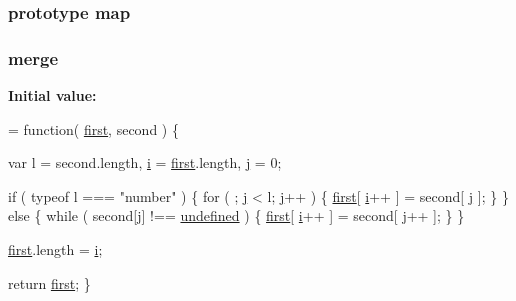 \subsubsection[{map}]{ {\bf prototype} map}\label{jquery-1_810_82-vsdoc_8js_a20838f8c4bedc779e51bf830f5a4d471}
\hypertarget{jquery-1_810_82-vsdoc_8js_a32b25eeaa50c1bd6453e8956949b36e3}{}
\subsubsection[{merge}]{ merge}\label{jquery-1_810_82-vsdoc_8js_a32b25eeaa50c1bd6453e8956949b36e3}
{\bfseries Initial value\+:}
\begin{DoxyCode}
= \textcolor{keyword}{function}( \hyperlink{jquery-1_810_82-vsdoc_8js_a436adcac6bdff190fbce85670078e885}{first}, second ) \{


        var l = second.length,
            \hyperlink{_bibabook_2_scripts_2respond_8min_8js_a5e25b1d1bed9ab5f3174b76d6a722180}{i} = \hyperlink{jquery-1_810_82-vsdoc_8js_a436adcac6bdff190fbce85670078e885}{first}.length,
            \hyperlink{_bibabook_2_scripts_2jquery_8validate_8unobtrusive_8min_8js_a5f7d9fc7ba35dc513eb3080d74d27476}{j} = 0;

        \textcolor{keywordflow}{if} ( typeof l === \textcolor{stringliteral}{"number"} ) \{
            \textcolor{keywordflow}{for} ( ; \hyperlink{_bibabook_2_scripts_2jquery_8validate_8unobtrusive_8min_8js_a5f7d9fc7ba35dc513eb3080d74d27476}{j} < l; \hyperlink{_bibabook_2_scripts_2jquery_8validate_8unobtrusive_8min_8js_a5f7d9fc7ba35dc513eb3080d74d27476}{j}++ ) \{
                \hyperlink{jquery-1_810_82-vsdoc_8js_a436adcac6bdff190fbce85670078e885}{first}[ \hyperlink{_bibabook_2_scripts_2respond_8min_8js_a5e25b1d1bed9ab5f3174b76d6a722180}{i}++ ] = second[ \hyperlink{_bibabook_2_scripts_2jquery_8validate_8unobtrusive_8min_8js_a5f7d9fc7ba35dc513eb3080d74d27476}{j} ];
            \}
        \} \textcolor{keywordflow}{else} \{
            \textcolor{keywordflow}{while} ( second[\hyperlink{_bibabook_2_scripts_2jquery_8validate_8unobtrusive_8min_8js_a5f7d9fc7ba35dc513eb3080d74d27476}{j}] !== \hyperlink{jquery-1_810_82-vsdoc_8js_a08113a236cc18d2a9d5ce27e638012be}{undefined} ) \{
                \hyperlink{jquery-1_810_82-vsdoc_8js_a436adcac6bdff190fbce85670078e885}{first}[ \hyperlink{_bibabook_2_scripts_2respond_8min_8js_a5e25b1d1bed9ab5f3174b76d6a722180}{i}++ ] = second[ \hyperlink{_bibabook_2_scripts_2jquery_8validate_8unobtrusive_8min_8js_a5f7d9fc7ba35dc513eb3080d74d27476}{j}++ ];
            \}
        \}

        \hyperlink{jquery-1_810_82-vsdoc_8js_a436adcac6bdff190fbce85670078e885}{first}.length = \hyperlink{_bibabook_2_scripts_2respond_8min_8js_a5e25b1d1bed9ab5f3174b76d6a722180}{i};

        \textcolor{keywordflow}{return} \hyperlink{jquery-1_810_82-vsdoc_8js_a436adcac6bdff190fbce85670078e885}{first};
    \}
\end{DoxyCode}
